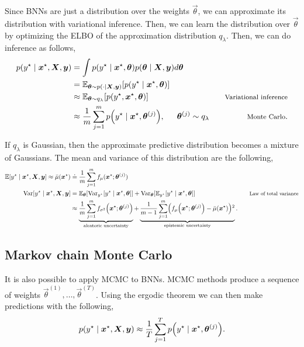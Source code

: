 Since BNNs are just a distribution over the weights $\vec{\theta}$, we can
approximate its distribution with variational inference. Then, we can learn the
distribution over $\vec{\theta}$ by optimizing the ELBO of the approximation
distribution $q_{\lambda}$. Then, we can do inference as follows,
\begin{align*}
  p(y^\star\mid\vec{x}^\star,\mat{X},\vec{y}) &= \int p(y^\star\mid\vec{x}^\star,\vec{\theta}) p(\vec{\theta}\mid\mat{X},\vec{y}) d\vec{\theta} \\
  &= \E_{\vec{\theta}\sim p(\cdot\mid\mat{X},\vec{y})}[p(y^\star\mid\vec{x}^\star,\vec{\theta})] \\
  &\approx \E_{\vec{\theta}\sim q_{\lambda}} [p(y^\star,\vec{x}^\star,\vec{\theta})] & \text{\footnotesize Variational inference} \\
  &\approx \frac{1}{m} \sum_{j=1}^m p \lft( y^\star\mid\vec{x}^\star,\vec{\theta}^{(j)} \rgt), \hspace{1.5em} \vec{\theta}^{(j)} \sim q_{\lambda} & \text{\footnotesize Monte Carlo}
.\end{align*}

If $q_{\lambda}$ is Gaussian, then the approximate predictive distribution
becomes a mixture of Gaussians. The mean and variance of this distribution are
the following,
\begin{align*}
  \E[y^\star\mid\vec{x}^\star,\mat{X},\vec{y}] \approx \bar{\mu}(\vec{x}^\star) &\doteq \frac{1}{m}\sum_{j=1}^m f_\mu(\vec{x}^\star;\vec{\theta}^{(j)}) \\
  \text{Var}[y^\star\mid\vec{x}^\star,\mat{X},\vec{y}] &= \E_{\vec{\theta}}[\text{Var}_{y^\star}[y^\star\mid\vec{x}^\star,\vec{\theta}]] + \text{Var}_{\vec{\theta}}[\E_{y^\star}[y^\star\mid\vec{x}^\star,\vec{\theta}]] & \text{\footnotesize Law of total variance} \\
  &\approx \underbrace{\frac{1}{m} \sum_{j=1}^m f_{\sigma^2} \lft( \vec{x}^\star;\vec{\theta}^{(j)} \rgt)}_{\text{aleatoric uncertainty}} + \underbrace{\frac{1}{m-1} \sum_{j=1}^m \lft( f_\mu \lft( \vec{x}^\star;\vec{\theta}^{(j)} \rgt) - \bar{\mu}(\vec{x}^\star) \rgt)^2}_{\text{epistemic uncertainty}}
.\end{align*}

\subsection{Markov chain Monte Carlo}

It is also possible to apply MCMC to BNNs. MCMC methods produce a sequence of
weights $\vec{\theta}^{(1)}, \ldots, \vec{\theta}^{(T)}$. Using the ergodic
theorem we can then make predictions with the following, \[
  p(y^\star\mid\vec{x}^\star,\mat{X},\vec{y}) \approx \frac{1}{T} \sum_{j=1}^T p \lft( y^\star\mid\vec{x}^\star,\vec{\theta}^{(j)} \rgt)
.\]

